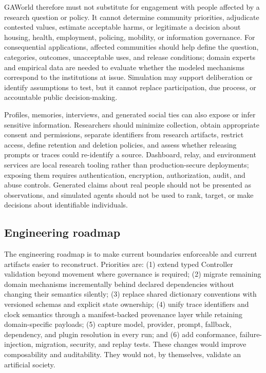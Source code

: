 GAWorld therefore must not substitute for engagement with people affected by
a research question or policy.  It cannot determine community priorities,
adjudicate contested values, estimate acceptable harms, or legitimate a
decision about housing, health, employment, policing, mobility, or information
governance.  For consequential applications, affected communities should help
define the question, categories, outcomes, unacceptable uses, and release
conditions; domain experts and empirical data are needed to evaluate whether
the modeled mechanisms correspond to the institutions at issue.  Simulation
may support deliberation or identify assumptions to test, but it cannot replace
participation, due process, or accountable public decision-making.

Profiles, memories, interviews, and generated social ties can also expose or
infer sensitive information.  Researchers should minimize collection, obtain
appropriate consent and permissions, separate identifiers from research
artifacts, restrict access, define retention and deletion policies, and assess
whether releasing prompts or traces could re-identify a source.  Dashboard,
relay, and environment services are local research tooling rather than
production-secure deployments; exposing them requires authentication,
encryption, authorization, audit, and abuse controls.  Generated claims about
real people should not be presented as observations, and simulated agents
should not be used to rank, target, or make decisions about identifiable
individuals.

\subsection{Engineering roadmap}

The engineering roadmap is to make current boundaries enforceable and current
artifacts easier to reconstruct.  Priorities are: (1) extend typed Controller
validation beyond movement where governance is required; (2) migrate remaining domain mechanisms incrementally behind declared
dependencies without changing their semantics silently; (3) replace shared
dictionary conventions with versioned schemas and explicit state ownership;
(4) unify trace identifiers and clock semantics through a manifest-backed
provenance layer while retaining domain-specific payloads; (5) capture model,
provider, prompt, fallback, dependency, and plugin resolution in every run;
and (6) add conformance, failure-injection, migration, security, and replay
tests.  These changes would improve composability and auditability.  They would
not, by themselves, validate an artificial society.

